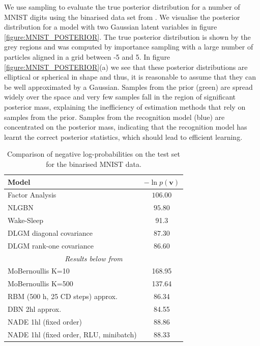\documentclass{article}
\begin{document}
\begin{bibunit}[icml2013]
We use sampling to evaluate the true posterior distribution for a number of 
MNIST digits using the binarised data set from \citet{larochelle2011}.
We visualise the posterior distribution for a 
model with two Gaussian latent variables in figure 
\ref{figure:MNIST_POSTERIOR}. The true posterior distribution is shown by 
the grey regions and was computed by importance sampling with a large 
number of particles aligned in a grid between -5 and 5. In figure 
\ref{figure:MNIST_POSTERIOR}(a) we see that these posterior distributions  
are elliptical or spherical in shape and thus, it is reasonable to assume that 
they can be well approximated by a Gaussian. Samples from the 
prior (green) are spread widely over the space and very few 
samples fall in the region of significant posterior mass, explaining the 
inefficiency of estimation methods that rely on samples from the prior. 
Samples from the recognition model (blue) are concentrated on 
the posterior mass, indicating that the recognition model has learnt the 
correct posterior statistics, which should lead to efficient learning. 
\begin{table}[tbp]
\vspace{-3mm}
\centering
\scriptsize
\caption{Comparison of negative log-probabilities on the test set for the binarised MNIST data. }
\label{tab:mnist}
\begin{tabular}{lc}
\hline
\textbf{Model} & $-\ln p(\mathbf{v})$ \\
\hline \hline
Factor Analysis & $106.00$ \\
NLGBN \citep{frey1999a} & $95.80$ \\
Wake-Sleep \citep{dayan2000} & 91.3\\
DLGM diagonal covariance & $87.30$ \\
DLGM rank-one covariance & $86.60$ \\
\hline
\multicolumn{2}{c}{\tiny\textit{Results below from \citet{uria2013}}} \\
MoBernoullis K=10 & 168.95 \\
MoBernoullis K=500 & 137.64 \\
RBM (500 h, 25 CD steps) approx. & 86.34\\
DBN 2hl approx. & 84.55\\
NADE 1hl (fixed order) & 88.86\\
NADE 1hl (fixed order, RLU, minibatch) & 88.33\\

\end{tabular}
\end{table}
\end{bibunit}
\end{document}
